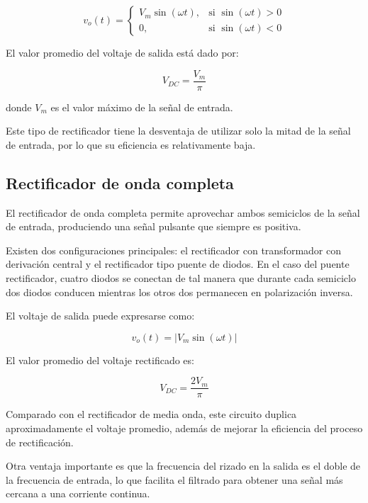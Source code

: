 \documentclass[journal]{IEEEtran}
\begin{document}
\begin{equation}
v_o(t)=
\begin{cases}
V_m \sin(\omega t), & \text{si } \sin(\omega t) > 0 \\
0, & \text{si } \sin(\omega t) < 0
\end{cases}
\end{equation}

El valor promedio del voltaje de salida está dado por:

\begin{equation}
V_{DC} = \frac{V_m}{\pi}
\end{equation}

donde $V_m$ es el valor máximo de la señal de entrada.

Este tipo de rectificador tiene la desventaja de utilizar solo la mitad de la señal de entrada, por lo que su eficiencia es relativamente baja.

\subsection{Rectificador de onda completa}

El rectificador de onda completa permite aprovechar ambos semiciclos de la señal de entrada, produciendo una señal pulsante que siempre es positiva.

Existen dos configuraciones principales: el rectificador con transformador con derivación central y el rectificador tipo puente de diodos. En el caso del puente rectificador, cuatro diodos se conectan de tal manera que durante cada semiciclo dos diodos conducen mientras los otros dos permanecen en polarización inversa.

El voltaje de salida puede expresarse como:

\begin{equation}
v_o(t) = |V_m \sin(\omega t)|
\end{equation}

El valor promedio del voltaje rectificado es:

\begin{equation}
V_{DC} = \frac{2V_m}{\pi}
\end{equation}

Comparado con el rectificador de media onda, este circuito duplica aproximadamente el voltaje promedio, además de mejorar la eficiencia del proceso de rectificación.

Otra ventaja importante es que la frecuencia del rizado en la salida es el doble de la frecuencia de entrada, lo que facilita el filtrado para obtener una señal más cercana a una corriente continua.
\end{document}
